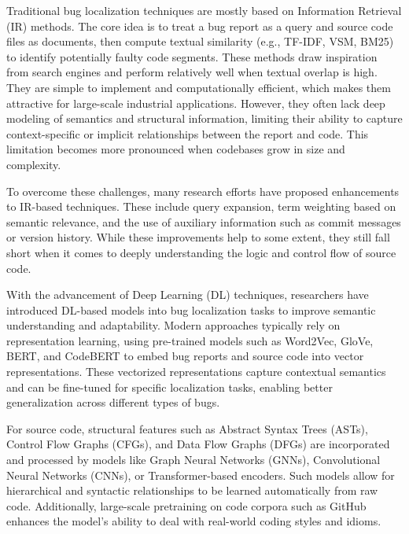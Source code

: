 \documentclass[manuscript,screen,review]{acmart}
\begin{document}
Traditional bug localization techniques are mostly based on Information Retrieval (IR) methods. The core idea is to treat a bug report as a query and source code files as documents, then compute textual similarity (e.g., TF-IDF, VSM, BM25) to identify potentially faulty code segments. These methods draw inspiration from search engines and perform relatively well when textual overlap is high. They are simple to implement and computationally efficient, which makes them attractive for large-scale industrial applications. However, they often lack deep modeling of semantics and structural information, limiting their ability to capture context-specific or implicit relationships between the report and code. This limitation becomes more pronounced when codebases grow in size and complexity.

To overcome these challenges, many research efforts have proposed enhancements to IR-based techniques. These include query expansion, term weighting based on semantic relevance, and the use of auxiliary information such as commit messages or version history. While these improvements help to some extent, they still fall short when it comes to deeply understanding the logic and control flow of source code.

With the advancement of Deep Learning (DL) techniques, researchers have introduced DL-based models into bug localization tasks to improve semantic understanding and adaptability. Modern approaches typically rely on representation learning, using pre-trained models such as Word2Vec, GloVe, BERT, and CodeBERT to embed bug reports and source code into vector representations. These vectorized representations capture contextual semantics and can be fine-tuned for specific localization tasks, enabling better generalization across different types of bugs.

For source code, structural features such as Abstract Syntax Trees (ASTs), Control Flow Graphs (CFGs), and Data Flow Graphs (DFGs) are incorporated and processed by models like Graph Neural Networks (GNNs), Convolutional Neural Networks (CNNs), or Transformer-based encoders. Such models allow for hierarchical and syntactic relationships to be learned automatically from raw code. Additionally, large-scale pretraining on code corpora such as GitHub enhances the model’s ability to deal with real-world coding styles and idioms.
\end{document}
